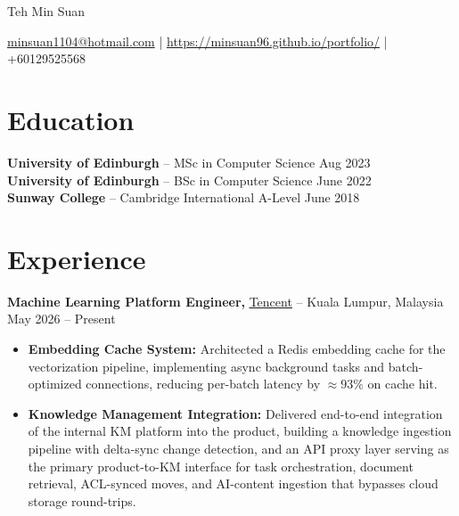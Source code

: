 \documentclass[11pt]{article}       %
\begin{document}
\centerline{\Huge Teh Min Suan}

\vspace{5pt}

\centerline{\href{mailto:minsuan1104@hotmail.com}{minsuan1104@hotmail.com} | \href{https://minsuan96.github.io/portfolio/}{https://minsuan96.github.io/portfolio/} | {+60129525568}}

\vspace{-10pt}

\section*{Education}
\textbf{University of Edinburgh} -- MSc in Computer Science \hfill Aug 2023 \\
\textbf{University of Edinburgh} -- BSc in Computer Science \hfill June 2022 \\
\textbf{Sunway College} -- Cambridge International A-Level \hfill June 2018

\vspace{-6.5pt}

\section*{Experience}

\textbf{Machine Learning Platform Engineer,} {\href{https://www.tencent.com/}{\underline{Tencent}}} -- Kuala Lumpur, Malaysia \hfill May 2026 -- Present \\
\vspace{-9pt}
\begin{itemize}
  \item \textbf{Embedding Cache System:} Architected a Redis embedding cache for the vectorization pipeline, implementing async background tasks and batch-optimized connections, reducing per-batch latency by $\approx 93\%$ on cache hit.
  \item \textbf{Knowledge Management Integration:} Delivered end-to-end integration of the internal KM platform into the product, building a knowledge ingestion pipeline with delta-sync change detection, and an API proxy layer serving as the primary product-to-KM interface for task orchestration, document retrieval, ACL-synced moves, and AI-content ingestion that bypasses cloud storage round-trips.
\end{itemize}
\end{document}
